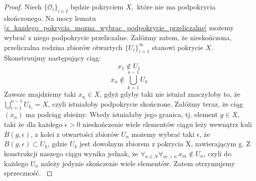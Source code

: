 \documentclass[licencjacka]{pwr_wmat_praca_dyplomowa}
\theoremstyle{plain}
\numberwithin{theorem}{chapter}
\theoremstyle{definition}
\numberwithin{theorem}{chapter}
\begin{document}
\begin{proof}
{Niech $\{\mathcal{O}_i\}_{i \in I}$ będzie pokryciem $X,$ które nie ma podpokrycia skończonego. Na mocy lematu \ref{z_kazdego_pokrycia_mozna_wybrac_podpokrycie_przeliczalne} możemy wybrać z niego podpokrycie przeliczalne.
Załóżmy zatem, że nieskończona, przeliczalna rodzina zbiorów otwartych $\{U_i\}_{i=1}^{\infty}$ stanowi pokrycie $X$. Skonstruujmy następujący ciąg: 
$$x_1 \notin U_1$$
$$x_n \notin \bigcup_{k=1}^{n-1} U_k$$ Zawsze znajdziemy taki $x_n \in X$, gdyż gdyby taki nie istniał znaczyłoby to, że $\bigcup_{i=1}^{n-1}{U_{k_i}} = X$, czyli istniałoby podpokrycie skończone. Załóżmy teraz, że ciąg $(x_n)$ ma podciąg zbieżny. Wtedy istniałaby jego granica, tj. element $g \in X,$ taki że dla każdego $\epsilon > 0$ nieskończenie wiele elementów ciągu leży wewnątrz kuli $B(g, \epsilon)$, z kolei z otwartości zbiorów $U_n$ możemy wybrać taki $\epsilon$, że $B(g, \epsilon) \subset U_k$, gdzie $U_k$ jest dowolnym zbiorem z pokrycia X, zawierającym g. Z konstrukcji naszego ciągu wynika jednak, że $\forall_{n \in N} \forall_{m>n} \, x_m \notin U_n$, czyli do każdego $U_n$ należy jedynie skończenie wiele elementów. Zatem otrzymujemy sprzeczność.
}
\end{proof}
\end{document}
